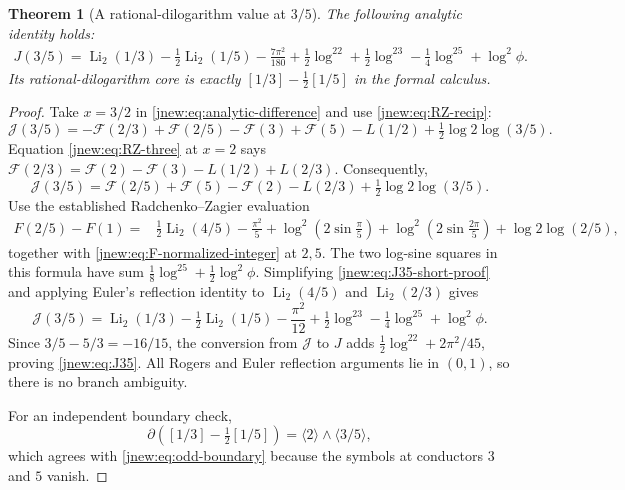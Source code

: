 \documentclass[11pt,a4paper]{article}
\newtheorem{theorem}{Theorem}[section]
\theoremstyle{definition}
\theoremstyle{remark}
\numberwithin{equation}{section}
\begin{document}
\begin{theorem}[A rational-dilogarithm value at $3/5$]
\label{jnew:thm:J35}
The following analytic identity holds:
\begin{align}
 \boxed{\displaystyle
 J(3/5)=\operatorname{Li}_2(1/3)-\frac12\operatorname{Li}_2(1/5)
 -\frac{7\pi^2}{180}+\frac12\log^22+\frac12\log^23
 -\frac14\log^25+\log^2\phi.}
 \label{jnew:eq:J35}
\end{align}
Its rational-dilogarithm core is exactly
$[1/3]-\tfrac12[1/5]$ in the formal calculus.
\end{theorem}
\begin{proof}
Take $x=3/2$ in \eqref{jnew:eq:analytic-difference} and use
\eqref{jnew:eq:RZ-recip}:
\[
 \mathcal J(3/5)
 =-\mathcal F(2/3)+\mathcal F(2/5)-\mathcal F(3)+\mathcal F(5)
  -L(1/2)+\tfrac12\log2\log(3/5).
\]
Equation \eqref{jnew:eq:RZ-three} at $x=2$ says
$\mathcal F(2/3)=\mathcal F(2)-\mathcal F(3)-L(1/2)+L(2/3)$.
Consequently,
\begin{equation}\label{jnew:eq:J35-short-proof}
 \mathcal J(3/5)=\mathcal F(2/5)+\mathcal F(5)-\mathcal F(2)
       -L(2/3)+\tfrac12\log2\log(3/5).
\end{equation}
Use the established Radchenko--Zagier evaluation
\cite[eq.~(24)]{RadchenkoZagier}
\begin{align*}
 F(2/5)-F(1)
  ={}&\tfrac12\operatorname{Li}_2(4/5)-\frac{\pi^2}{5}
    +\log^2\left(2\sin\frac\pi5\right)
    +\log^2\left(2\sin\frac{2\pi}5\right)
    +\log2\log(2/5),
\end{align*}
together with \eqref{jnew:eq:F-normalized-integer} at $2,5$.
The two log-sine squares in this formula have sum
$\tfrac18\log^25+\tfrac12\log^2\phi$.
Simplifying \eqref{jnew:eq:J35-short-proof} and applying Euler's
reflection identity to $\operatorname{Li}_2(4/5)$ and
$\operatorname{Li}_2(2/3)$ gives
\[
 \mathcal J(3/5)=\operatorname{Li}_2(1/3)
    -\tfrac12\operatorname{Li}_2(1/5)-\frac{\pi^2}{12}
    +\tfrac12\log^23-\tfrac14\log^25+\log^2\phi.
\]
Since $3/5-5/3=-16/15$, the conversion from $\mathcal J$ to $J$
adds $\tfrac12\log^22+2\pi^2/45$, proving
\eqref{jnew:eq:J35}. All Rogers and Euler reflection arguments
lie in $(0,1)$, so there is no branch ambiguity.

For an independent boundary check,
\[
 \partial\left([1/3]-\tfrac12[1/5]\right)
 =\langle2\rangle\wedge\langle3/5\rangle,
\]
which agrees with \eqref{jnew:eq:odd-boundary} because the symbols
at conductors $3$ and $5$ vanish.
\end{proof}
\end{document}
